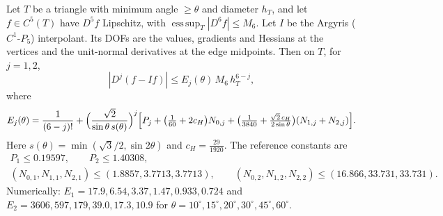 \begin{lemma}\label{pb:lem:arg}
Let $T$ be a triangle with minimum angle $\ge\theta$ and diameter $h_T$, and let $f\in C^5(T)$ have $D^5f$ Lipschitz, with
$\operatorname{ess\,sup}_T|D^6f|\le M_6$. Let $I$ be the Argyris ($C^1$-$P_5$) interpolant. Its DOFs are the values,
gradients and Hessians at the vertices and the unit-normal derivatives at the edge midpoints. Then on $T$, for $j=1,2$,
\[|D^j(f-If)|\le E_j(\theta)\,M_6\,h_T^{6-j},\]
where
\[E_j(\theta)=\frac1{(6-j)!}+\Bigl(\frac{\sqrt2}{\sin\theta\,s(\theta)}\Bigr)^{j}\Bigl[P_j+\bigl(\tfrac1{60}+2c_H\bigr)N_{0,j}
+\bigl(\tfrac1{3840}+\tfrac{\sqrt2\,c_H}{2\sin\theta}\bigr)(N_{1,j}+N_{2,j})\Bigr].\]
Here $s(\theta)=\min(\sqrt3/2,\sin2\theta)$ and $c_H=\tfrac{29}{1920}$. The reference constants are
\begin{gather*}P_1\le0.19597,\qquad P_2\le1.40308,\\ (N_{0,1},N_{1,1},N_{2,1})\le(1.8857,3.7713,3.7713),\qquad
(N_{0,2},N_{1,2},N_{2,2})\le(16.866,33.731,33.731).\end{gather*}
Numerically: $E_1=17.9,6.54,3.37,1.47,0.933,0.724$ and $E_2=3606,597,179,39.0,17.3,10.9$ for
$\theta=10^\circ,15^\circ,20^\circ,30^\circ,45^\circ,60^\circ$.
\end{lemma}

